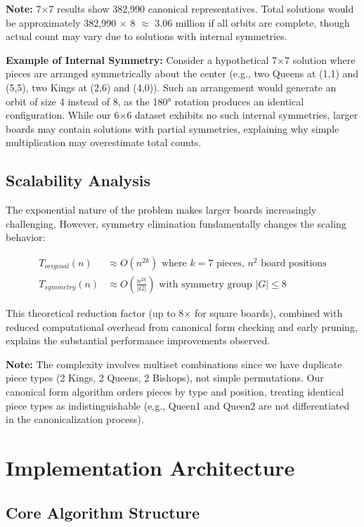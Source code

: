 \documentclass[12pt,a4paper]{article}
\theoremstyle{definition}
\begin{document}
\textbf{Note:} 7$\times$7 results show 382,990 canonical representatives. Total solutions would be approximately 382,990 $\times$ 8 $\approx$ 3.06 million if all orbits are complete, though actual count may vary due to solutions with internal symmetries.

\textbf{Example of Internal Symmetry:} Consider a hypothetical 7$\times$7 solution where pieces are arranged symmetrically about the center (e.g., two Queens at (1,1) and (5,5), two Kings at (2,6) and (4,0)). Such an arrangement would generate an orbit of size 4 instead of 8, as the 180° rotation produces an identical configuration. While our 6$\times$6 dataset exhibits no such internal symmetries, larger boards may contain solutions with partial symmetries, explaining why simple multiplication may overestimate total counts.

\subsection{Scalability Analysis}

The exponential nature of the problem makes larger boards increasingly challenging. However, symmetry elimination fundamentally changes the scaling behavior:

\begin{align}
T_{original}(n) &\approx O(n^{2k}) \text{ where } k = 7 \text{ pieces, } n^2 \text{ board positions} \\
T_{symmetry}(n) &\approx O\left(\frac{n^{2k}}{|G|}\right) \text{ with symmetry group } |G| \leq 8
\end{align}

This theoretical reduction factor (up to 8× for square boards), combined with reduced computational overhead from canonical form checking and early pruning, explains the substantial performance improvements observed.

\textbf{Note:} The complexity involves multiset combinations since we have duplicate piece types (2 Kings, 2 Queens, 2 Bishops), not simple permutations. Our canonical form algorithm orders pieces by type and position, treating identical piece types as indistinguishable (e.g., Queen1 and Queen2 are not differentiated in the canonicalization process).

\section{Implementation Architecture}

\subsection{Core Algorithm Structure}
\end{document}
